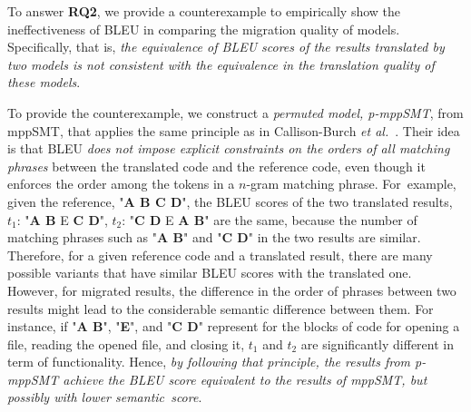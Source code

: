 To answer {\bf RQ2}, we provide a counterexample to empirically show the 
ineffectiveness of BLEU in comparing the migration quality of models. 
%
Specifically, that is, {\em the equivalence of BLEU scores of the results translated 
by two models is not consistent with the equivalence in the translation quality 
of these models}.
%

To provide the counterexample, we construct a {\em permuted model,
  p-mppSMT}, from mppSMT, that applies the same principle as in
Callison-Burch {\em et al.}~\cite{Callison}. Their idea is that BLEU
{\em does not impose explicit constraints on the orders of all
  matching phrases} between the translated code and the reference
code, even though it enforces the order among the tokens in a $n$-gram 
matching phrase. 
%
For~example, given the reference, "\textbf{A B C D}", the BLEU scores
of the two translated results, $t_1$: "\textbf{A B} E \textbf{C D}",
$t_2$: "\textbf{C D} E \textbf{A B}" are the same, because the number
of matching phrases such as "{\bf A B}" and "{\bf C D}" in the two results are
similar. Therefore, for a given reference code and a translated
result, there are many possible variants that have similar BLEU
scores with the translated one. However, for migrated results,
the difference in the order of phrases between two results might lead
to the considerable semantic difference between them. For
instance, if "\textbf{A B}", "\textbf{E}", and "\textbf{C D}"
represent for the blocks of code for opening a file, reading the opened
file, and closing it, $t_1$ and $t_2$ are significantly
different in term of functionality. Hence, {\em by following that
  principle, the results from p-mppSMT achieve the BLEU score equivalent
  to the results of mppSMT, but possibly with lower semantic~score}.

